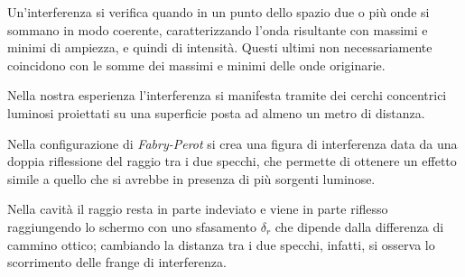 Un'interferenza si verifica quando in un punto dello spazio due o più onde si sommano in modo coerente, caratterizzando l'onda risultante con massimi e minimi di ampiezza, e quindi di intensità. Questi ultimi non necessariamente coincidono con le somme dei massimi e minimi delle onde originarie.

Nella nostra esperienza l'interferenza si manifesta tramite dei cerchi concentrici luminosi proiettati su una superficie posta ad almeno un metro di distanza.

Nella configurazione di \textit{Fabry-Perot} si crea una figura di interferenza data da una doppia riflessione del raggio tra i due specchi, che permette di ottenere un effetto simile a quello che si avrebbe in presenza di più sorgenti luminose.

Nella cavità il raggio resta in parte indeviato e viene in parte riflesso raggiungendo lo schermo con uno sfasamento $\delta_r$ che dipende dalla differenza di cammino ottico; cambiando la distanza tra i due specchi, infatti, si osserva lo scorrimento delle frange di interferenza. 

